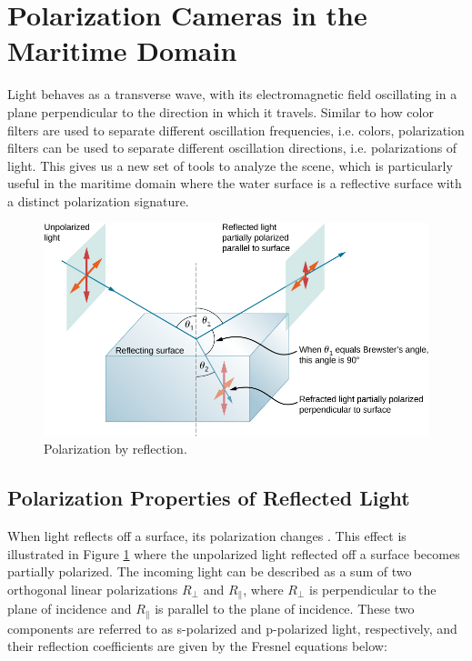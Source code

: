 

\section{Polarization Cameras in the Maritime Domain}
Light behaves as a transverse wave, with its electromagnetic field oscillating in a plane perpendicular to the direction in which it travels.
Similar to how color filters are used to separate different oscillation frequencies, i.e. colors, polarization filters can be used to separate different oscillation directions, i.e. polarizations of light.
This gives us a new set of tools to analyze the scene, which is particularly useful in the maritime domain where the water surface is a reflective surface with a distinct polarization signature.
\begin{figure}[H]
    \centering
    \includegraphics[width=.8\linewidth]{figures/polarization/reflaction.png}
    \caption{Polarization by reflection.
        \cite[Figure 1.38]{lingUniversityPhysicsVolume2016}}
    \label{fig:polarized_reflection}
\end{figure}
\subsection{Polarization Properties of Reflected Light}
When light reflects off a surface, its polarization changes \cite[34]{lingUniversityPhysicsVolume2016}.
This effect is illustrated in Figure \ref{fig:polarized_reflection} where the unpolarized light reflected off a surface becomes partially polarized.
The incoming light can be described as a sum of two orthogonal linear polarizations $R_\perp$ and $R_\parallel$, where $R_\perp$ is perpendicular to the plane of incidence and $R_\parallel$ is parallel to the plane of incidence.
These two components are referred to as s-polarized and p-polarized light, respectively, and their reflection coefficients are given by the Fresnel equations below:

